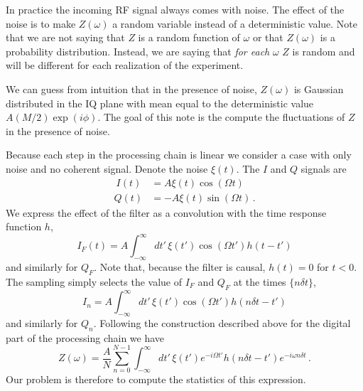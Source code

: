 
In practice the incoming RF signal always comes with noise.
The effect of the noise is to make $Z(\omega)$ a random variable instead of a deterministic value.
Note that we are not saying that $Z$ is a random function of $\omega$ or that $Z(\omega)$ is a probability distribution.
Instead, we are saying that \emph{for each }$\omega$ $Z$ is random and will be different for each realization of the experiment.

We can guess from intuition that in the presence of noise, $Z(\omega)$ is Gaussian distributed in the IQ plane with mean equal to the deterministic value $A(M/2)\exp(i \phi)$.
The goal of this note is the compute the fluctuations of $Z$ in the presence of noise.

Because each step in the processing chain is linear we consider a case with only noise and no coherent signal.
Denote the noise $\xi(t)$.
The $I$ and $Q$ signals are
\begin{align}\
I(t) &= A \xi(t) \cos(\Omega t) \\
Q(t) &= - A \xi(t) \sin(\Omega t) \, .
\end{align}
We express the effect of the filter as a convolution with the time response function $h$,
\begin{equation}
I_F(t) = A \int_{-\infty}^\infty dt' \, \xi(t') \cos(\Omega t') h(t - t')
\end{equation}
and similarly for $Q_F$.
Note that, because the filter is causal, $h(t)=0$ for $t<0$.
The sampling simply selects the value of $I_F$ and $Q_F$ at the times $\{ n \delta t \}$,
\begin{equation}
I_n = A \int_{-\infty}^\infty dt' \, \xi(t') \cos(\Omega t') h(n \delta t - t')
\end{equation}
and similarly for $Q_n$.
Following the construction described above for the digital part of the processing chain we have
\begin{equation}
Z(\omega) =
\frac{A}{N}\sum_{n=0}^{N-1} \int_{-\infty}^\infty dt' \, \xi(t') e^{-i \Omega t'} h(n \delta t - t') e^{-i \omega n \delta t} \, .
\end{equation}
Our problem is therefore to compute the statistics of this expression.

